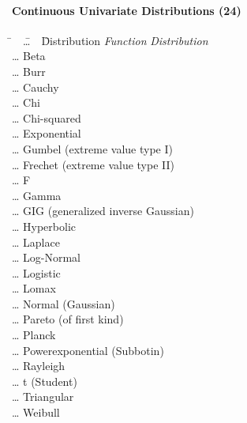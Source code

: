 \paragraph{Continuous Univariate Distributions (24)}

\begin{tabbing}
	\hspace*{1em}
	\= ~~\=\ldots~~\=  Distribution \kill
	\> \emph{Function} \> \> \emph{Distribution} \\[1ex]
	\> 	\> \ldots \> Beta \\
	\> 	\> \ldots \> Burr \\
	\> 	\> \ldots \> Cauchy \\
	\> 	\> \ldots \> Chi \\
	\> 	\> \ldots \> Chi-squared \\
	\> 	\> \ldots \> Exponential \\
	\> 	\> \ldots \> Gumbel (extreme value type I) \\
	\> 	\> \ldots \> Frechet (extreme value type II) \\
	\> 	\> \ldots \> F \\
	\> 	\> \ldots \> Gamma \\
	\> 	\> \ldots \> GIG (generalized inverse Gaussian) \\
	\> 	\> \ldots \> Hyperbolic \\
	\> 	\> \ldots \> Laplace \\
	\> 	\> \ldots \> Log-Normal \\
	\> 	\> \ldots \> Logistic \\
	\> 	\> \ldots \> Lomax \\
	\> 	\> \ldots \> Normal (Gaussian) \\
	\> 	\> \ldots \> Pareto (of first kind) \\
	\> 	\> \ldots \> Planck \\
	\> 	\> \ldots \> Powerexponential (Subbotin) \\
	\> 	\> \ldots \> Rayleigh \\
	\> 	\> \ldots \> t (Student) \\
	\> 	\> \ldots \> Triangular \\
	\> 	\> \ldots \> Weibull \\
\end{tabbing}

